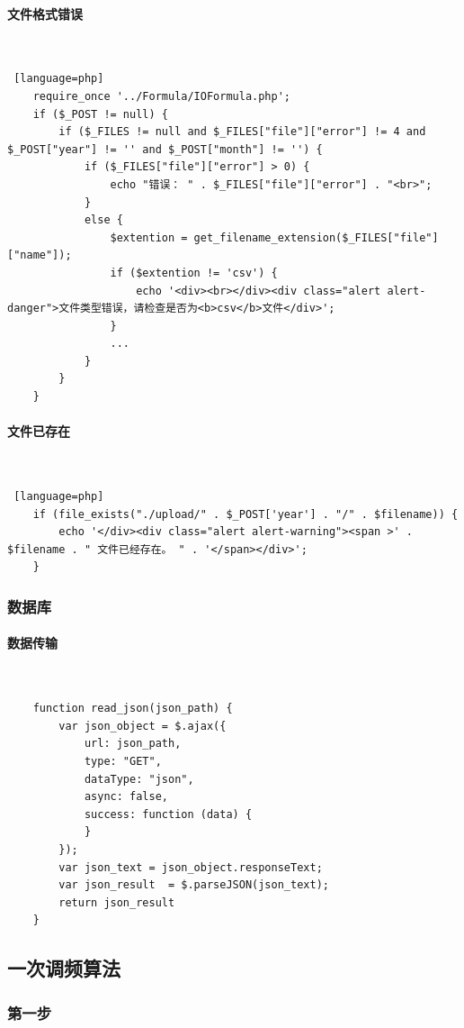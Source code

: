 \documentclass[winfonts,UTF8,a4paper]{ctexart}
\begin{document}
\paragraph*{文件格式错误}\ \\
\begin{lstlisting} [language=php]
	require_once '../Formula/IOFormula.php';
	if ($_POST != null) {
		if ($_FILES != null and $_FILES["file"]["error"] != 4 and $_POST["year"] != '' and $_POST["month"] != '') {
			if ($_FILES["file"]["error"] > 0) {
				echo "错误： " . $_FILES["file"]["error"] . "<br>";
			}
			else {
				$extention = get_filename_extension($_FILES["file"]["name"]);
				if ($extention != 'csv') {
					echo '<div><br></div><div class="alert alert-danger">文件类型错误，请检查是否为<b>csv</b>文件</div>';
				}
				...
			}
		}
	}
\end{lstlisting}
\paragraph*{文件已存在}\ \\
\begin{lstlisting} [language=php]
	if (file_exists("./upload/" . $_POST['year'] . "/" . $filename)) {
		echo '</div><div class="alert alert-warning"><span >' . $filename . " 文件已经存在。 " . '</span></div>';
	}
\end{lstlisting}
\subsubsection*{数据库}
\paragraph*{数据传输}\ \\
\begin{lstlisting} 
	function read_json(json_path) {
		var json_object = $.ajax({
			url: json_path,
			type: "GET",
			dataType: "json",
			async: false,
			success: function (data) {
			}
		});
		var json_text = json_object.responseText;
		var json_result  = $.parseJSON(json_text);
		return json_result
	}
\end{lstlisting}
\subsection*{一次调频算法}
\subsubsection*{第一步}
\end{document}
